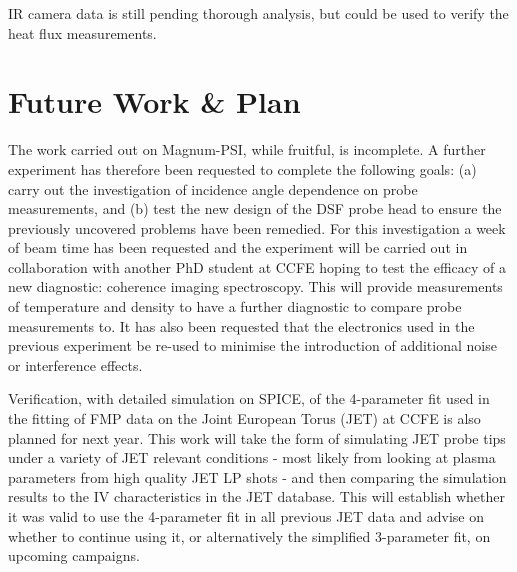\documentclass[a4paper, 12pt]{article} %
\begin{document}
	IR camera data is still pending thorough analysis, but could be used to verify the heat flux measurements.


\section{\label{sec:phd}Future Work \& Plan}

	The work carried out on Magnum-PSI, while fruitful, is incomplete.
	A further experiment has therefore been requested to complete the following goals: (a) carry out the investigation of incidence angle dependence on probe measurements, and (b) test the new design of the DSF probe head to ensure the previously uncovered problems have been remedied.
	For this investigation a week of beam time has been requested and the experiment will be carried out in collaboration with another PhD student at CCFE hoping to test the efficacy of a new diagnostic: coherence imaging spectroscopy.
	This will provide measurements of temperature and density to have a further diagnostic to compare probe measurements to. 
	It has also been requested that the electronics used in the previous experiment be re-used to minimise the introduction of additional noise or interference effects.

	Verification, with detailed simulation on SPICE, of the 4-parameter fit used in the fitting of FMP data on the Joint European Torus (JET) at CCFE is also planned for next year.
	This work will take the form of simulating JET probe tips under a variety of JET relevant conditions - most likely from looking at plasma parameters from high quality JET LP shots - and then comparing the simulation results to the IV characteristics in the JET database. 
	This will establish whether it was valid to use the 4-parameter fit in all previous JET data and advise on whether to continue using it, or alternatively the simplified 3-parameter fit, on upcoming campaigns.
\end{document}
